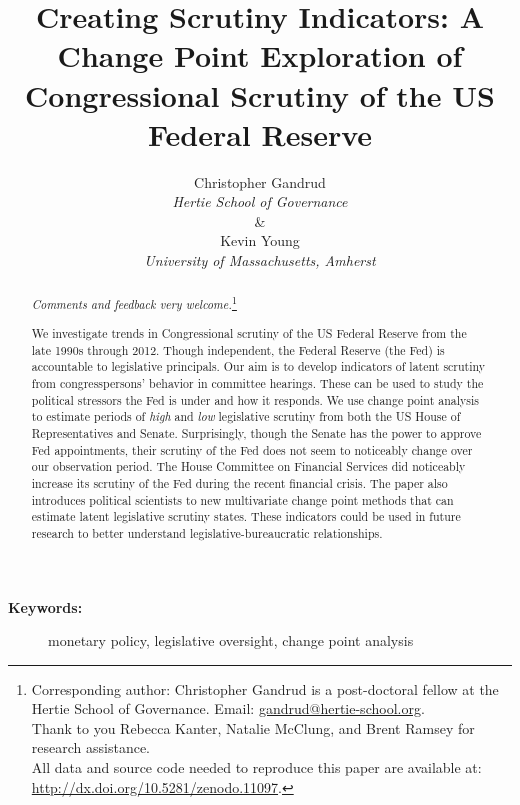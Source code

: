 \documentclass[a4paper]{article}\usepackage[]{graphicx}\usepackage[]{color}
\title{Creating Scrutiny Indicators: A Change Point Exploration of Congressional Scrutiny of the US Federal Reserve}
\author{Christopher Gandrud \\ {\emph{Hertie School of Governance}} \\ \& \\ Kevin Young \\ {\emph{University of Massachusetts, Amherst}}}
\begin{document}
\maketitle

\begin{abstract}

\noindent\emph{Comments and feedback very welcome.}\footnote{Corresponding author: Christopher Gandrud is a post-doctoral fellow at the Hertie School of Governance. Email: \href{mailto:gandrud@hertie-school.org}{gandrud@hertie-school.org}. \\ Thank to you Rebecca Kanter, Natalie McClung, and Brent Ramsey for research assistance. \\
All data and source code needed to reproduce this paper are available at: \url{http://dx.doi.org/10.5281/zenodo.11097}.}

We investigate trends in Congressional scrutiny of the US Federal Reserve from the late 1990s through 2012. Though independent, the Federal Reserve (the Fed) is accountable to legislative principals. Our aim is to develop indicators of latent scrutiny from congresspersons' behavior in committee hearings. These can be used to study the political stressors the Fed is under and how it responds. We use change point analysis to estimate periods of \emph{high} and \emph{low} legislative scrutiny from both the US House of Representatives and Senate. Surprisingly, though the Senate has the power to approve Fed appointments, their scrutiny of the Fed does not seem to noticeably change over our observation period. The House Committee on Financial Services did noticeably increase its scrutiny of the Fed during the recent financial crisis. The paper also introduces political scientists to new multivariate change point methods that can estimate latent legislative scrutiny states. These indicators could be used in future research to better understand legislative-bureaucratic relationships.

\end{abstract}

\begin{description}
  \item [{\textbf{Keywords:}}] monetary policy, legislative oversight, change point analysis
\end{description}
\end{document}
